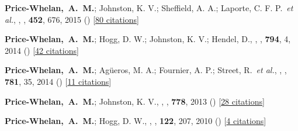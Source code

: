\item[{\color{deemph}\scriptsize5}]\textbf{Price-Whelan,~A.~M.}; Johnston, K. V.; Sheffield, A. A.; Laporte, C. F. P.~\textit{et al.}, , \mnras, \textbf{452}, 676, 2015 () [\href{http://adsabs.harvard.edu/abs/2015MNRAS.452..676P}{80 citations}]

\item[{\color{deemph}\scriptsize4}]\textbf{Price-Whelan,~A.~M.}; Hogg, D. W.; Johnston, K. V.; Hendel, D., , \apj, \textbf{794}, 4, 2014 () [\href{http://adsabs.harvard.edu/abs/2014ApJ...794....4P}{42 citations}]

\item[{\color{deemph}\scriptsize3}]\textbf{Price-Whelan,~A.~M.}; Ag{\"u}eros, M. A.; Fournier, A. P.; Street, R.~\textit{et al.}, , \apj, \textbf{781}, 35, 2014 () [\href{http://adsabs.harvard.edu/abs/2014ApJ...781...35P}{11 citations}]

\item[{\color{deemph}\scriptsize2}]\textbf{Price-Whelan,~A.~M.}; Johnston, K. V., , \apj, \textbf{778}, 2013 () [\href{http://adsabs.harvard.edu/abs/2013ApJ...778L..12P}{28 citations}]

\item[{\color{deemph}\scriptsize1}]\textbf{Price-Whelan,~A.~M.}; Hogg, D. W., , \pasp, \textbf{122}, 207, 2010 () [\href{http://adsabs.harvard.edu/abs/2010PASP..122..207P}{4 citations}]